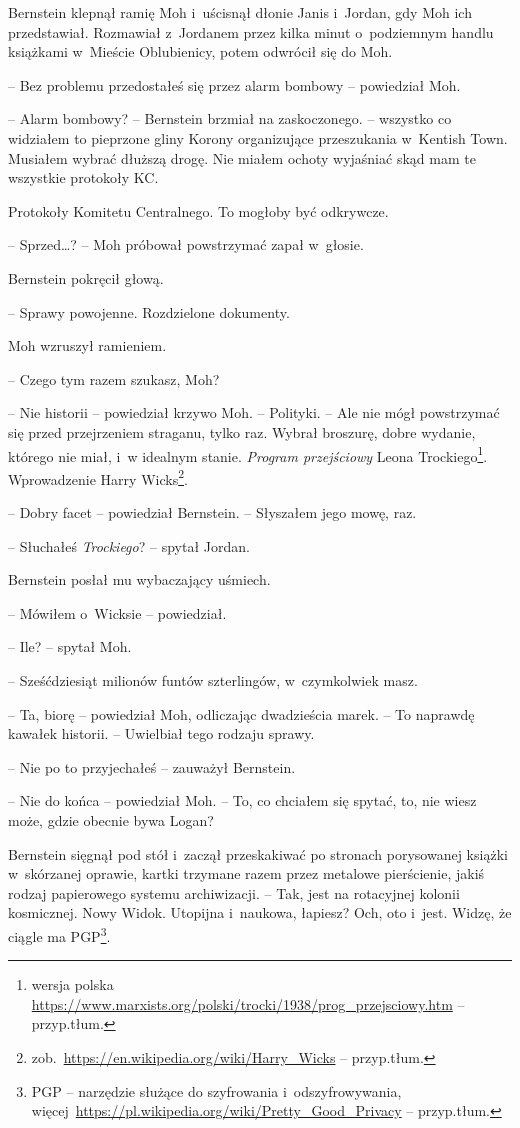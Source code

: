 \documentclass[oneside,polish,11pt,sfheadings]{mwbk}
\begin{document}
Bernstein klepnął ramię Moh i~uścisnął dłonie Janis i~Jordan, gdy Moh
ich przedstawiał. Rozmawiał z~Jordanem przez kilka minut o~podziemnym
handlu książkami w~Mieście Oblubienicy, potem odwrócił się do Moh.

-- Bez problemu przedostałeś się przez alarm bombowy -- powiedział Moh.

-- Alarm bombowy? -- Bernstein brzmiał na zaskoczonego. -- wszyst\-ko co
widziałem to pieprzone gliny Korony organizujące przeszukania w~Kentish
Town. Musiałem wybrać dłuższą drogę. Nie miałem ochoty wyjaśniać skąd
mam te wszystkie protokoły KC.

Protokoły Komitetu Centralnego. To mogłoby być odkrywcze.

-- Sprzed\ldots? -- Moh próbował powstrzymać zapał w~głosie.

Bernstein pokręcił głową. 

-- Sprawy powojenne. Rozdzielone dokumenty.

Moh wzruszył ramieniem.

-- Czego tym razem szukasz, Moh?

-- Nie historii -- powiedział krzywo Moh. -- Polityki. -- Ale nie mógł
powstrzymać się przed przejrzeniem straganu, tylko raz. Wybrał broszurę,
dobre wydanie, którego nie miał, i~w idealnym stanie. \emph{Program
przejściowy} Leona Trockiego\footnote{wersja polska
\url{https://www.marxists.org/polski/trocki/1938/prog\_przejsciowy.htm} -- przyp.tłum.}. Wprowadzenie Harry Wicks\footnote{
zob.~\url{https://en.wikipedia.org/wiki/Harry\_Wicks} -- przyp.tłum.}.

-- Dobry facet -- powiedział Bernstein. -- Słyszałem jego mowę, raz.

-- Słuchałeś \emph{Trockiego}? -- spytał Jordan.

Bernstein posłał mu wybaczający uśmiech. 

-- Mówiłem o~Wicksie -- powiedział.

-- Ile? -- spytał Moh.

-- Sześćdziesiąt milionów funtów szterlingów, w~czymkolwiek masz.

-- Ta, biorę -- powiedział Moh, odliczając dwadzieścia marek. -- To
naprawdę kawałek historii. -- Uwielbiał tego rodzaju sprawy.

-- Nie po to przyjechałeś -- zauważył Bernstein.

-- Nie do końca -- powiedział Moh. -- To, co chciałem się spytać, to, nie
wiesz może, gdzie obecnie bywa Logan?

Bernstein sięgnął pod stół i~zaczął przeskakiwać po stronach porysowanej
książki w~skórzanej oprawie, kartki trzymane razem przez metalowe
pierścienie, jakiś rodzaj papierowego systemu archiwizacji. -- Tak, jest
na rotacyjnej kolonii kosmicznej. Nowy Widok. Utopijna i~naukowa,
łapiesz? Och, oto i~jest. Widzę, że ciągle ma PGP\footnote{PGP -- narzędzie
służące do szyfrowania i~odszyfrowywania,
więcej~\url{https://pl.wikipedia.org/wiki/Pretty\_Good\_Privacy}
-- przyp.tłum.}.
\end{document}
